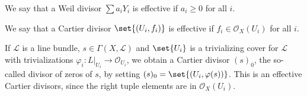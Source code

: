 We say that a Weil divisor $\sum a_iY_i$ is effective if $a_i\geq 0$ for all $i$.

We say that a Cartier divisor $\set{(U_i, f_i)}$ is effective if
$f_i \in \mathcal{O}_X(U_i)$ for all $i$.

If $\mathcal{L}$ is a line bundle, $s \in \Gamma(X, \mathcal{L})$ and
$\set{U_i}$ is a trivializing cover for $\mathcal{L}$ with trivializations
$\varphi_i\colon L|_{U_i}\to \mathcal{O}_{U_i}$, we obtain a Cartier divisor
$(s)_0$, the so-called divisor of zeros of $s$, by setting $(s)_0 = \set{(U_i, \varphi(s))}$.
This is an effective Cartier divisors, since the right tuple elements are in
$\mathcal{O}_X(U_i)$.
